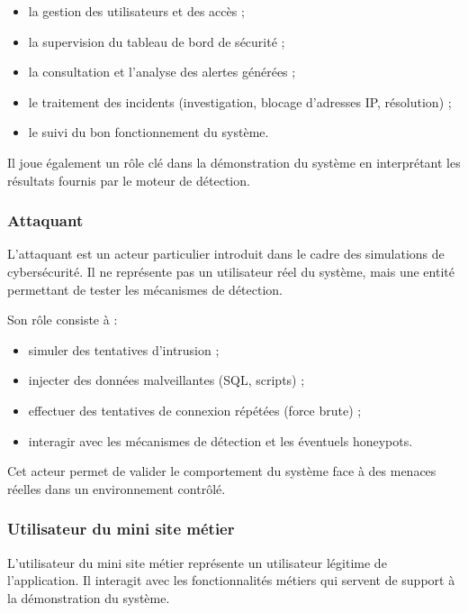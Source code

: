 \documentclass[a4paper,12pt]{report}
\begin{document}
    \begin{itemize}
        \item la gestion des utilisateurs et des accès ;
        \item la supervision du tableau de bord de sécurité ;
        \item la consultation et l’analyse des alertes générées ;
        \item le traitement des incidents (investigation, blocage d’adresses IP, résolution) ;
        \item le suivi du bon fonctionnement du système.
    \end{itemize}
    
    Il joue également un rôle clé dans la démonstration du système en interprétant les résultats fournis par le moteur de détection.
    
    \subsubsection{Attaquant}
    
    L’attaquant est un acteur particulier introduit dans le cadre des simulations de cybersécurité. Il ne représente pas un utilisateur réel du système, mais une entité permettant de tester les mécanismes de détection.
    
    Son rôle consiste à :
    
    \begin{itemize}
        \item simuler des tentatives d’intrusion ;
        \item injecter des données malveillantes (SQL, scripts) ;
        \item effectuer des tentatives de connexion répétées (force brute) ;
        \item interagir avec les mécanismes de détection et les éventuels honeypots.
    \end{itemize}
    
    Cet acteur permet de valider le comportement du système face à des menaces réelles dans un environnement contrôlé.
    
    \subsubsection{Utilisateur du mini site métier}
    
    L’utilisateur du mini site métier représente un utilisateur légitime de l’application. Il interagit avec les fonctionnalités métiers qui servent de support à la démonstration du système.
    
\end{document}
